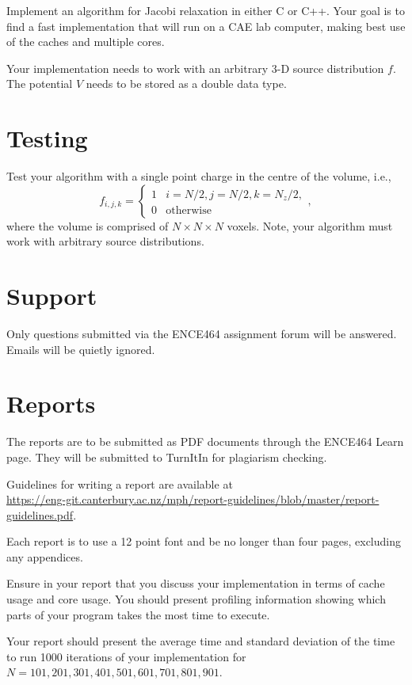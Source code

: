 \documentclass[a4paper,11pt]{article}
\begin{document}
Implement an algorithm for Jacobi relaxation in either C or C++.  Your
goal is to find a fast implementation that will run on a CAE lab
computer, making best use of the caches and multiple cores.

Your implementation needs to work with an arbitrary 3-D source
distribution $f$.  The potential $V$ needs to be stored as a double
data type.



\section{Testing}

Test your algorithm with a single point charge in the centre of the
volume, i.e.,
%
\begin{equation}
  f_{i,j,k} = \left\{
  \begin{array}{ll}
    1 & i=N/2, j=N/2, k=N_z/2, \\
    0 & \mbox{otherwise}
  \end{array}\right.,
\end{equation}
%
where the volume is comprised of $N \times N \times N$ voxels.
Note, your algorithm must work with arbitrary source distributions.




\section{Support}

Only questions submitted via the ENCE464 assignment forum will be
answered.  Emails will be quietly ignored.


\section{Reports}

The reports are to be submitted as PDF documents through the ENCE464
Learn page.  They will be submitted to TurnItIn for plagiarism
checking.

Guidelines for writing a report are available at\\
\url{https://eng-git.canterbury.ac.nz/mph/report-guidelines/blob/master/report-guidelines.pdf}.

Each report is to use a 12 point font and be no longer than four
pages, excluding any appendices.

Ensure in your report that you discuss your implementation in terms of
cache usage and core usage.  You should present profiling information
showing which parts of your program takes the most time to execute.

Your report should present the average time and standard deviation of
the time to run 1000 iterations of your implementation for $N=101,
201, 301, 401, 501, 601, 701, 801, 901$.

\end{document}
